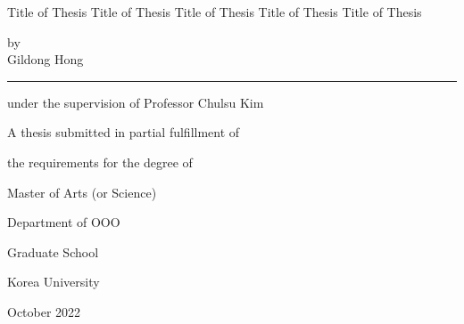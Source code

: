 \documentclass{report}
\begin{document}

\newpage %
\begin{center}
\huge Title of Thesis Title of Thesis Title of Thesis Title of Thesis Title of Thesis  
\par\vspace{3cm} %
\Large by\\
Gildong Hong
\par\vspace{0.5cm}
\rule{.6\textwidth}{0.4pt} %
\par\vspace{0.7cm}
under the supervision of Professor Chulsu Kim
\par\vspace{0.7cm}
A thesis submitted in partial fulfillment of \par
the requirements for the degree of \par
Master of Arts (or Science)  
\par\vspace{10pt}
\Large Department of OOO %
\par\vspace{1.5cm}
\LARGE Graduate School 
\par\vspace{0.5cm}
\LARGE Korea University 
\par\vspace{1cm}
\large October 2022 %
\end{center}


\end{document}
